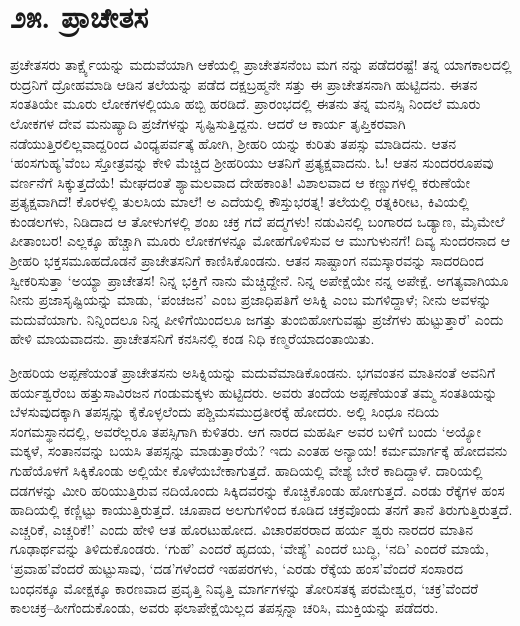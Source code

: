 
\chapter{೨೫. ಪ್ರಾಚೇತಸ}

ಪ್ರಚೇತಸರು ತಾರ್ಕ್ಷ್ಯೆಯನ್ನು ಮದುವೆಯಾಗಿ ಆಕೆಯಲ್ಲಿ ಪ್ರಾಚೇತಸನೆಂಬ ಮಗ ನನ್ನು ಪಡೆದರಷ್ಟೆ! ತನ್ನ ಯಾಗಕಾಲದಲ್ಲಿ ರುದ್ರನಿಗೆ ದ್ರೋಹಮಾಡಿ ಆಡಿನ ತಲೆಯನ್ನು ಪಡೆದ ದಕ್ಷಬ್ರಹ್ಮನೇ ಸತ್ತು ಈ ಪ್ರಾಚೇತಸನಾಗಿ ಹುಟ್ಟಿದನು. ಈತನ ಸಂತತಿಯೇ ಮೂರು ಲೋಕಗಳಲ್ಲಿಯೂ ಹಬ್ಬಿ ಹರಡಿದೆ. ಪ್ರಾರಂಭದಲ್ಲಿ ಈತನು ತನ್ನ ಮನಸ್ಸಿ ನಿಂದಲೆ ಮೂರು ಲೋಕಗಳ ದೇವ ಮನುಷ್ಯಾದಿ ಪ್ರಜೆಗಳನ್ನು ಸೃಷ್ಟಿಸುತ್ತಿದ್ದನು. ಆದರೆ ಆ ಕಾರ್ಯ ತೃಪ್ತಿಕರವಾಗಿ ನಡೆಯುತ್ತಿರಲಿಲ್ಲವಾದ್ದರಿಂದ ವಿಂಧ್ಯಪರ್ವತ್ಕೆ ಹೋಗಿ, ಶ್ರೀಹರಿ ಯನ್ನು ಕುರಿತು ತಪಸ್ಸು ಮಾಡಿದನು. ಆತನ ‘ಹಂಸಗುಹ್ಯ’ವೆಂಬ ಸ್ತೋತ್ರವನ್ನು ಕೇಳಿ ಮೆಚ್ಚಿದ ಶ್ರೀಹರಿಯು ಆತನಿಗೆ ಪ್ರತ್ಯಕ್ಷವಾದನು. ಓ! ಆತನ ಸುಂದರರೂಪವು ವರ್ಣನೆಗೆ ಸಿಕ್ಕುತ್ತದೆಯೆ! ಮೇಘದಂತೆ ಶ್ಯಾಮಲವಾದ ದೇಹಕಾಂತಿ! ವಿಶಾಲವಾದ ಆ ಕಣ್ಣುಗಳಲ್ಲಿ ಕರುಣೆಯೇ ಪ್ರತ್ಯಕ್ಷವಾಗಿದೆ! ಕೊರಳಲ್ಲಿ ತುಲಸಿಯ ಮಾಲೆ! ಅ ಎದೆಯಲ್ಲಿ ಕೌಸ್ತುಭರತ್ನ! ತಲೆಯಲ್ಲಿ ರತ್ನಕಿರೀಟ, ಕಿವಿಯಲ್ಲಿ ಕುಂಡಲಗಳು, ನಿಡಿದಾದ ಆ ತೋಳುಗಳಲ್ಲಿ ಶಂಖ ಚಕ್ರ ಗದೆ ಪದ್ಮಗಳು! ನಡುವಿನಲ್ಲಿ ಬಂಗಾರದ ಒಡ್ಯಾಣ, ಮೈಮೇಲೆ ಪೀತಾಂಬರ! ಎಲ್ಲಕ್ಕೂ ಹೆಚ್ಚಾಗಿ ಮೂರು ಲೋಕಗಳನ್ನೂ ಮೋಹಗೊಳಿಸುವ ಆ ಮುಗುಳುನಗೆ! ದಿವ್ಯ ಸುಂದರನಾದ ಆ ಶ್ರೀಹರಿ ಭಕ್ತಸಮೂಹದೊಡನೆ ಪ್ರಾಚೇತಸನಿಗೆ ಕಾಣಿಸಿಕೊಂಡನು. ಆತನ ಸಾಷ್ಟಾಂಗ ನಮಸ್ಕಾರವನ್ನು ಸಾದರದಿಂದ ಸ್ವೀಕರಿಸುತ್ತಾ ‘ಅಯ್ಯಾ ಪ್ರಾಚೇತಸ! ನಿನ್ನ ಭಕ್ತಿಗೆ ನಾನು ಮೆಚ್ಚಿದ್ದೇನೆ. ನಿನ್ನ ಅಪೇಕ್ಷೆಯೇ ನನ್ನ ಅಪೇಕ್ಷೆ. ಅಗತ್ಯವಾಗಿಯೂ ನೀನು ಪ್ರಜಾಸೃಷ್ಟಿಯನ್ನು ಮಾಡು, ‘ಪಂಚಜನ’ ಎಂಬ ಪ್ರಜಾಧಿಪತಿಗೆ ಅಸಿಕ್ನಿ ಎಂಬ ಮಗಳಿದ್ದಾಳೆ; ನೀನು ಅವಳನ್ನು ಮದುವೆಯಾಗು. ನಿನ್ನಿಂದಲೂ ನಿನ್ನ ಪೀಳಿಗೆಯಿಂದಲೂ ಜಗತ್ತು ತುಂಬಿಹೋಗುವಷ್ಟು ಪ್ರಜೆಗಳು ಹುಟ್ಟುತ್ತಾರೆ’ ಎಂದು ಹೇಳಿ ಮಾಯವಾದನು. ಪ್ರಾಚೇತಸನಿಗೆ ಕನಸಿನಲ್ಲಿ ಕಂಡ ನಿಧಿ ಕಣ್ಮರೆಯಾದಂತಾಯಿತು.

ಶ್ರೀಹರಿಯ ಅಪ್ಪಣೆಯಂತೆ ಪ್ರಾಚೇತಸನು ಅಸಿಕ್ನಿಯನ್ನು ಮದುವೆಮಾಡಿಕೊಂಡನು. ಭಗವಂತನ ಮಾತಿನಂತೆ ಅವನಿಗೆ ಹರ್ಯಶ್ವರೆಂಬ ಹತ್ತುಸಾವಿರಜನ ಗಂಡುಮಕ್ಕಳು ಹುಟ್ಟಿದರು. ಅವರು ತಂದೆಯ ಅಪ್ಪಣೆಯಂತೆ ತಮ್ಮ ಸಂತತಿಯನ್ನು ಬೆಳಸುವುದಕ್ಕಾಗಿ ತಪಸ್ಸನ್ನು ಕೈಕೊಳ್ಳಲೆಂದು ಪಶ್ಚಿಮಸಮುದ್ರತೀರಕ್ಕೆ ಹೋದರು. ಅಲ್ಲಿ ಸಿಂಧೂ ನದಿಯ ಸಂಗಮಸ್ಥಾನದಲ್ಲಿ, ಅವರೆಲ್ಲರೂ ತಪಸ್ಸಿಗಾಗಿ ಕುಳಿತರು. ಆಗ ನಾರದ ಮಹರ್ಷಿ ಅವರ ಬಳಿಗೆ ಬಂದು ‘ಅಯ್ಯೋ ಮಕ್ಕಳೆ, ಸಂತಾನವನ್ನು ಬಯಸಿ ತಪಸ್ಸನ್ನು ಮಾಡುತ್ತಾರೆಯೆ? ಇದು ಎಂತಹ ಅನ್ಯಾಯ! ಕರ್ಮಮಾರ್ಗಕ್ಕೆ ಹೋದವನು ಗುಹೆಯೊಳಗೆ ಸಿಕ್ಕಿಕೊಂಡು ಅಲ್ಲಿಯೇ ಕೊಳೆಯಬೇಕಾಗುತ್ತದೆ. ಹಾದಿಯಲ್ಲಿ ವೇಶ್ಯೆ ಬೇರೆ ಕಾದಿದ್ದಾಳೆ. ದಾರಿಯಲ್ಲಿ ದಡಗಳನ್ನು ಮೀರಿ ಹರಿಯುತ್ತಿರುವ ನದಿಯೊಂದು ಸಿಕ್ಕಿದವರನ್ನು ಕೊಚ್ಚಿಕೊಂಡು ಹೋಗುತ್ತದೆ. ಎರಡು ರೆಕ್ಕೆಗಳ ಹಂಸ ಹಾದಿಯಲ್ಲಿ ಕಣ್ಣಿಟ್ಟು ಕಾಯುತ್ತಿರುತ್ತದೆ. ಚೂಪಾದ ಅಲಗುಗಳಿಂದ ಕೂಡಿದ ಚಕ್ರವೊಂದು ತನಗೆ ತಾನೆ ತಿರುಗುತ್ತಿರುತ್ತದೆ. ಎಚ್ಚರಿಕೆ, ಎಚ್ಚರಿಕೆ!’ ಎಂದು ಹೇಳಿ ಆತ ಹೊರಟುಹೋದ. ವಿಚಾರಪರರಾದ ಹರ್ಯ ಶ್ವರು ನಾರದರ ಮಾತಿನ ಗೂಢಾರ್ಥವನ್ನು ತಿಳಿದುಕೊಂಡರು. ‘ಗುಹೆ’ ಎಂದರೆ ಹೃದಯ, ‘ವೇಶ್ಯೆ’ ಎಂದರೆ ಬುದ್ಧಿ, ‘ನದಿ’ ಎಂದರೆ ಮಾಯೆ, ‘ಪ್ರವಾಹ’ವೆಂದರೆ ಹುಟ್ಟುಸಾವು, ‘ದಡ’ಗಳೆಂದರೆ ಇಹಪರಗಳು, ‘ಎರಡು ರೆಕ್ಕೆಯ ಹಂಸ’ವೆಂದರೆ ಸಂಸಾರದ ಬಂಧನಕ್ಕೂ ಮೋಕ್ಷಕ್ಕೂ ಕಾರಣವಾದ ಪ್ರವೃತ್ತಿ ನಿವೃತ್ತಿ ಮಾರ್ಗಗಳನ್ನು ತೋರಿಸತಕ್ಕ ಪರಮೇಶ್ವರ, ‘ಚಕ್ರ’ವೆಂದರೆ ಕಾಲಚಕ್ರ–ಹೀಗೆಂದುಕೊಂಡು, ಅವರು ಫಲಾಪೇಕ್ಷೆಯಿಲ್ಲದ ತಪಸ್ಸನ್ನಾ ಚರಿಸಿ, ಮುಕ್ತಿಯನ್ನು ಪಡೆದರು.

